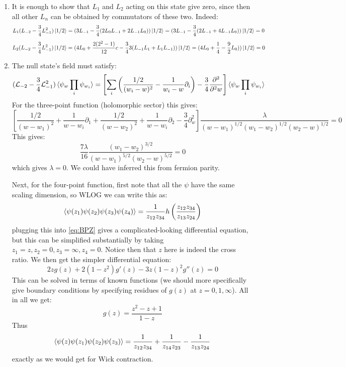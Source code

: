 \documentclass[11pt]{article}
\begin{document}
\begin{enumerate}
	\item It is enough to show that $L_1$ and $L_2$ acting on this state give zero, since then all other $L_n$ can be obtained by commutators of these two. Indeed:
	\[
		L_1 (L_{-2} - \frac34 L_{-1}^2) \ket{1/2} = (3 L_{-1} -\frac34 (2 L_0 L_{-1} + 2 L_{-1} L_0 ) ) \ket{1/2} = (3 L_{-1} - \frac34 ( 2 L_{-1} + 4 L_{-1} L_0) ) \ket{1/2}  = 0
	\]
	\[
		L_2 (L_{-2} - \frac34 L_{-1}^2) \ket{1/2} = (4 L_0 + \frac{2 (2^2 - 1)}{12} c - \frac34 3 (L_{-1} L_1 + L_1 L_{-1})) \ket{1/2} = (4 L_0 + \frac14 - \frac92 L_0 )) \ket{1/2} = 0
	\]
	\item The null state's field must satisfy:
	\begin{equation}\label{eq:BPZ}
				(\mathcal L_{-2} - \frac34 \mathcal L_{-1}^2) \braket{\psi_{w} \prod_{i} \psi_{w_i}} = \left[\sum_{i} \left(\frac{1/2}{(w_i - w)^2} - \frac{1}{w_i - w} \partial_i\right) - \frac34 \frac{\partial^2}{\partial^2 w}\right] \braket{\psi_{w} \prod_{i} \psi_{w_i}}
	\end{equation}
	For the three-point function (holomorphic sector) this gives:
	\[
		\left[ \frac{1/2}{(w-w_1)^2} + \frac{1}{w-w_i} \partial_1 + \frac{1/2}{(w-w_2)^2} + \frac{1}{w-w_i} \partial_2 - \frac34 \partial^2_w \right] \frac{\lambda}{(w - w_1)^{1/2} (w_1 - w_2)^{1/2} (w_2 - w)^{1/2}} = 0
	\]
	This gives:
	\[
		\frac{7 \lambda}{16} \frac{(w_1 - w_2)^{3/2}}{(w-w_1)^{5/2} (w_2 - w)^{5/2}} = 0
	\]
	which gives $\lambda = 0$. We could have inferred this from fermion parity. 
	
	Next, for the four-point function, first note that all the $\psi$ have the same scaling dimension, so WLOG we can write this as:
	\[
		\braket{\psi(z_1) \psi(z_2) \psi(z_3) \psi(z_4)} = \frac{1}{z_{12} z_{34}}  h\left(\frac{z_{12} z_{34}}{z_{13} z_{24}}\right)
	\]
	plugging this into \eqref{eq:BPZ} gives a complicated-looking differential equation, but this can be simplified substantially by taking $z_1 = z, z_2 = 0, z_3 = \infty, z_4 = 0$. Notice then that $z$ here is indeed the cross ratio. We then get the simpler differential equation:
	\[
		2 z g(z) + 2 (1-z^2) g'(z) - 3 z (1-z)^2 g''(z) = 0
	\]
	This can be solved in terms of known functions (we should more specifically give boundary conditions by specifying residues of $g(z)$ at $z = 0, 1, \infty$). All in all we get:
	\[
		g(z) = \frac{z^2 - z + 1}{1- z}
	\]
	Thus 
	\[
		\braket{\psi(z) \psi(z_1) \psi(z_2) \psi(z_3)} = \frac{1}{z_{12} z_{34}} + \frac{1}{z_{14} z_{23}} - \frac{1}{z_{13} z_{24}}
	\]
	exactly as we would get for Wick contraction. 
	

\end{enumerate}
\end{document}
